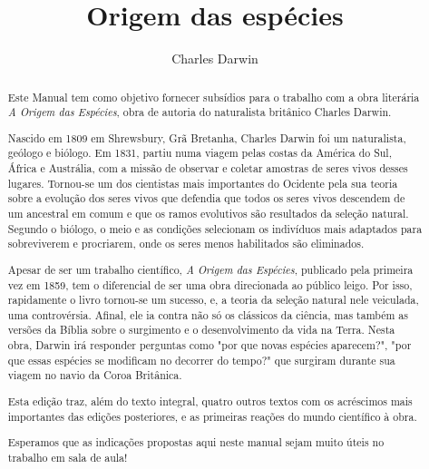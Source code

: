 \documentclass[12pt]{extarticle}
\begin{document}
\newcommand{\AutorLivro}{Charles Darwin}
\newcommand{\TituloLivro}{Origem das espécies}
\newcommand{\Tema}{História da ciência}
\newcommand{\Genero}{Tratado científico}
\newcommand{\imagemCapa}{./images/PNLD0060-01.png}
\newcommand{\issnppub}{---}
\newcommand{\issnepub}{---}
\newcommand{\colaborador}{\textbf{Fulano de Tal} é uma pessoa incrível e vai fazer um bom serviço.}


\title{\TituloLivro}
\author{\AutorLivro}
\def\authornotes{\colaborador}

\date{}
\maketitle



\baselineskip\par



\begin{abstract}
Este Manual tem como objetivo fornecer subsídios para o trabalho com a
obra literária \emph{A Origem das Espécies}, obra de autoria do
naturalista britânico Charles Darwin.

Nascido em 1809 em Shrewsbury, Grã Bretanha, Charles Darwin foi um naturalista,
geólogo e biólogo. Em 1831, partiu numa viagem pelas costas da América do Sul,
África e Austrália, com a missão de observar e coletar amostras de seres vivos
desses lugares. Tornou-se um dos cientistas mais importantes do Ocidente pela 
sua teoria sobre a evolução dos seres vivos que defendia que todos os seres vivos 
descendem de um ancestral em comum e que os ramos evolutivos são resultados da 
seleção natural. Segundo o biólogo, o meio e as condições selecionam os indivíduos 
mais adaptados para sobreviverem e procriarem, onde os seres menos habilitados são eliminados.

Apesar de ser um trabalho científico, \emph{A Origem das Espécies}, publicado pela 
primeira vez em 1859, tem o diferencial de ser uma obra direcionada ao público leigo. 
Por isso, rapidamente o livro tornou-se um sucesso, e, a teoria da seleção natural 
nele veiculada, uma controvérsia. Afinal, ele ia contra não só os clássicos da ciência, 
mas também as versões da Bíblia sobre o surgimento e o desenvolvimento da vida na Terra.
Nesta obra, Darwin irá responder perguntas como "por que novas espécies aparecem?", 
"por que essas espécies se modificam no decorrer do tempo?" que surgiram durante sua viagem
no navio da Coroa Britânica. 

Esta edição traz, além do texto integral, quatro outros textos com os acréscimos mais 
importantes das edições posteriores, e as primeiras reações do mundo científico à obra. 

Esperamos que as indicações propostas aqui neste manual sejam muito úteis no trabalho em
sala de aula!

\end{abstract}
\end{document}
